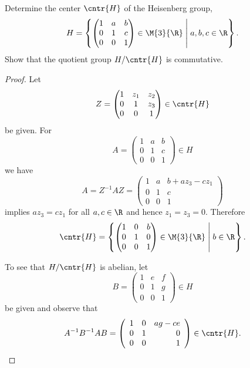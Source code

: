 \documentclass[10pt]{amsart}
\begin{document}
\begin{ex}
  Determine the center $\cntr{H}$ of the Heisenberg group,
  $$H = \left\{\left(\begin{matrix}1 & a & b\\0 & 1 & c\\0 & 0 & 1\end{matrix}\right) \in \M{3}{\R} \;\middle\vert\; a,b,c \in \R\right\}.$$
    Show that the quotient group $H/\cntr{H}$ is commutative.
    \begin{proof}
      Let 
      $$Z = \left(\begin{matrix}
      1 & z_1 & z_2\\
      0 & 1 & z_3\\
      0 & 0 & 1
      \end{matrix}\right) \in \cntr{H}$$
      be given.
      For 
      $$A = \left(\begin{matrix}1 & a & b\\0 & 1 & c\\0 & 0 & 1\end{matrix}\right) \in H$$
      we have  
      $$A = Z^{-1}AZ = \left(\begin{array}{rrr}
        1 & a & b + az_3 - cz_1\\
        0 & 1 & c \\
        0 & 0 & 1
      \end{array}\right)$$
      implies $az_3 = cz_1$ for all $a,c \in \R$ and hence $z_1 = z_3 = 0$.
      Therefore
      $$\cntr{H} = \left\{\left(\begin{matrix}1 & 0 & b\\0 & 1 & 0\\0 & 0 & 1\end{matrix}\right) \in \M{3}{\R} \;\middle\vert\; b \in \R\right\}.$$
        
        To see that $H/\cntr{H}$ is abelian, let
        $$B = \left(\begin{matrix}1 & e & f\\0 & 1 & g\\0 & 0 & 1\end{matrix}\right) \in H$$
          be given and observe that
        $$A^{-1}B^{-1}AB = \left(\begin{array}{rrr}
          1 & 0 & ag - ce\\
          0 & 1 & 0 \\
          0 & 0 & 1
        \end{array}\right) \in \cntr{H}.$$
    \end{proof}
\end{ex}
\end{document}
